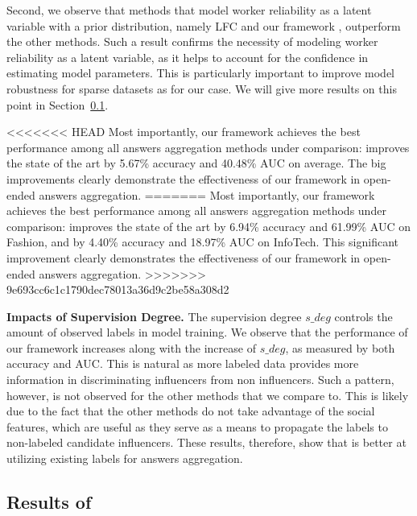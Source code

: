 Second, we observe that methods that model worker reliability as a latent variable with a prior distribution, namely LFC and our framework \sys, outperform the other methods. Such a result confirms the necessity of modeling worker reliability as a latent variable, as it helps to account for the confidence in estimating model parameters. This is particularly important to improve model robustness for sparse datasets as for our case. We  will give more results on this point in Section~\ref{sec:selfres}.

<<<<<<< HEAD
Most importantly, our framework \sys achieves the best performance among all answers aggregation methods under comparison: \sys improves the state of the art by 5.67\% accuracy and 40.48\% AUC on average. The big improvements clearly demonstrate the effectiveness of our framework in open-ended answers aggregation. 
=======
Most importantly, our framework \sys achieves the best performance among all answers aggregation methods under comparison: \sys improves the state of the art by 6.94\% accuracy and 61.99\% AUC on Fashion, and by 4.40\% accuracy and 18.97\% AUC on InfoTech. This significant improvement clearly demonstrates the effectiveness of our framework in open-ended answers aggregation. 
>>>>>>> 9e693cc6c1c1790dec78013a36d9c2be58a308d2



\smallskip
\noindent\textbf{Impacts of Supervision Degree.} The supervision degree $s\_deg$ controls the amount of observed labels in model training. We observe that the performance of our framework increases along with the increase of $s\_deg$, as measured by both accuracy and AUC. This is natural as more labeled data provides more information in discriminating influencers from non influencers. Such a pattern, however, is not observed for the other methods that we compare to. This is likely due to the fact that the other methods do not take advantage of the social features, which are useful as they serve as a means to propagate the labels to non-labeled candidate influencers. These results, therefore, show that \sys is better at utilizing existing labels for answers aggregation. 

\subsection{Results of \sys}
\label{sec:selfres}

